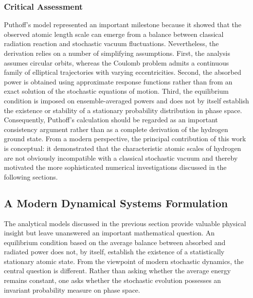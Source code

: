 \subsubsection*{Critical Assessment}
Puthoff's model represented an important milestone because it showed
that the observed atomic length scale can emerge from a balance between
classical radiation reaction and stochastic vacuum fluctuations.
Nevertheless, the derivation relies on a number of simplifying
assumptions.
First, the analysis assumes circular orbits, whereas the Coulomb problem
admits a continuous family of elliptical trajectories with varying
eccentricities. Second, the absorbed power is obtained using approximate
response functions rather than from an exact solution of the stochastic
equations of motion. Third, the equilibrium condition is imposed on
ensemble-averaged powers and does not by itself establish the existence
or stability of a stationary probability distribution in phase space.
Consequently, Puthoff's calculation should be regarded as an important
consistency argument rather than as a complete derivation of the
hydrogen ground state.
From a modern perspective, the principal contribution of this work is
conceptual: it demonstrated that the characteristic atomic scales of
hydrogen are not obviously incompatible with a classical stochastic
vacuum and thereby motivated the more sophisticated numerical
investigations discussed in the following sections.
\subsection{A Modern Dynamical Systems Formulation}
\label{sec:SEDModern}
The analytical models discussed in the previous section provide valuable
physical insight but leave unanswered an important mathematical
question. An equilibrium condition based on the average balance between
absorbed and radiated power does not, by itself, establish the existence
of a statistically stationary atomic state.
From the viewpoint of modern stochastic dynamics, the central question
is different.
Rather than asking whether the average energy remains constant, one asks
whether the stochastic evolution possesses an invariant probability
measure on phase space.
